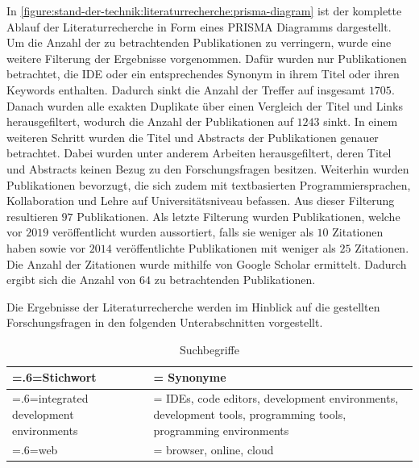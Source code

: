 In \autoref{figure:stand-der-technik:literaturrecherche:prisma-diagram} ist der komplette Ablauf der Literaturrecherche in Form eines PRISMA Diagramms \cite{noauthor_prisma_nodate} dargestellt. Um die Anzahl der zu betrachtenden Publikationen zu verringern, wurde eine weitere Filterung der Ergebnisse vorgenommen. Dafür wurden nur Publikationen betrachtet, die IDE oder ein entsprechendes Synonym in ihrem Titel oder ihren Keywords enthalten. Dadurch sinkt die Anzahl der Treffer auf insgesamt $1705$. Danach wurden alle exakten Duplikate über einen Vergleich der Titel und Links herausgefiltert, wodurch die Anzahl der Publikationen auf $1243$ sinkt. In einem weiteren Schritt wurden die Titel und Abstracts der Publikationen genauer betrachtet. Dabei wurden unter anderem Arbeiten herausgefiltert, deren Titel und Abstracts keinen Bezug zu den Forschungsfragen besitzen. Weiterhin wurden Publikationen bevorzugt, die sich zudem mit textbasierten Programmiersprachen, Kollaboration und Lehre auf Universitätsniveau befassen. Aus dieser Filterung resultieren $97$ Publikationen. Als letzte Filterung wurden Publikationen, welche vor $2019$ veröffentlicht wurden aussortiert, falls sie weniger als $10$ Zitationen haben sowie vor $2014$ veröffentlichte Publikationen mit weniger als $25$ Zitationen. Die Anzahl der Zitationen wurde mithilfe von Google Scholar \cite{noauthor_google-scholar_nodate} ermittelt. Dadurch ergibt sich die Anzahl von $64$ zu betrachtenden Publikationen.

Die Ergebnisse der Literaturrecherche werden im Hinblick auf die gestellten Forschungsfragen in den folgenden Unterabschnitten vorgestellt.

\begin{table}[tbp]
    \centering
    \begin{tabularx}{\textwidth}{>{\hsize=.6\hsize\linewidth=\hsize}X
            >{\hsize=1.4\hsize\linewidth=\hsize}X}
        \toprule
        Stichwort                           & Synonyme                                                                                                     \\
        \midrule
        integrated development environments & IDEs, code editors, development environments, development tools, programming tools, programming environments \\
        web                                 & browser, online, cloud                                                                                       \\
        \bottomrule
    \end{tabularx}
    \caption{Suchbegriffe}
    \label{table:search-terms}
\end{table}

